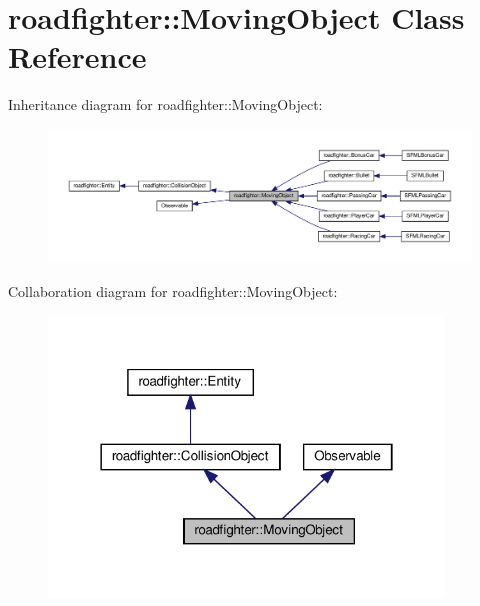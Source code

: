 \hypertarget{classroadfighter_1_1MovingObject}{}\section{roadfighter\+:\+:Moving\+Object Class Reference}
\label{classroadfighter_1_1MovingObject}


Inheritance diagram for roadfighter\+:\+:Moving\+Object\+:\nopagebreak
\begin{figure}[H]
\begin{center}
\leavevmode
\includegraphics[width=350pt]{classroadfighter_1_1MovingObject__inherit__graph}
\end{center}
\end{figure}


Collaboration diagram for roadfighter\+:\+:Moving\+Object\+:\nopagebreak
\begin{figure}[H]
\begin{center}
\leavevmode
\includegraphics[width=298pt]{classroadfighter_1_1MovingObject__coll__graph}
\end{center}
\end{figure}
